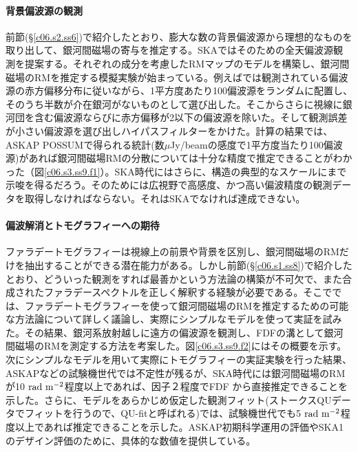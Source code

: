 \paragraph{背景偏波源の観測}

前節(\S \ref{c06.s2.ss6})で紹介したとおり、膨大な数の背景偏波源から理想的なものを取り出して、銀河間磁場の寄与を推定する。SKAではそのための全天偏波源観測を提案する。それぞれの成分を考慮したRMマップのモデルを構築し、銀河間磁場のRMを推定する模擬実験が始まっている。例えば\citet{2014ApJ...790..123A}では観測されている偏波源の赤方偏移分布に従いながら、1平方度あたり100偏波源をランダムに配置し、そのうち半数が介在銀河がないものとして選び出した。そこからさらに視線に銀河団を含む偏波源ならびに赤方偏移が2以下の偏波源を除いた。そして観測誤差が小さい偏波源を選び出しハイパスフィルターをかけた。計算の結果では、ASKAP POSSUMで得られる統計(数$\mu$Jy/beamの感度で1平方度当たり100偏波源)があれば銀河間磁場RMの分散については十分な精度で推定できることがわかった（図\ref{c06.s3.ss9.f1}）。SKA時代にはさらに、構造の典型的なスケールにまで示唆を得るだろう。そのためには広視野で高感度、かつ高い偏波精度の観測データを取得しなければならない。それはSKAでなければ達成できない。

\paragraph{偏波解消とトモグラフィーへの期待}

ファラデートモグラフィーは視線上の前景や背景を区別し、銀河間磁場のRMだけを抽出することができる潜在能力がある。しかし前節(\S \ref{c06.s1.ss8})で紹介したとおり、どういった観測をすれば最善かという方法論の構築が不可欠で、また合成されたファラデースペクトルを正しく解釈する経験が必要である。そこで\citet{2014PASJ...66...65A}では、ファラデートモグラフィーを使って銀河間磁場のRMを推定するための可能な方法論について詳しく議論し、実際にシンプルなモデルを使って実証を試みた。その結果、銀河系放射越しに遠方の偏波源を観測し、FDFの溝として銀河間磁場のRMを測定する方法を考案した。図\ref{c06.s3.ss9.f2}にはその概要を示す。次にシンプルなモデルを用いて実際にトモグラフィーの実証実験を行った結果、ASKAPなどの試験機世代では不定性が残るが、SKA時代には銀河間磁場のRMが10 ${\rm rad~m^{-2}}$程度以上であれば、因子２程度でFDF から直接推定できることを示した。さらに、モデルをあらかじめ仮定した観測フィット(ストークスQUデータでフィットを行うので、QU-fitと呼ばれる)では、試験機世代でも5 ${\rm rad~m^{-2}}$程度以上であれば推定できることを示した\citep{2014PASJ...66....5I}。ASKAP初期科学運用の評価やSKA1のデザイン評価のために、具体的な数値を提供している。

